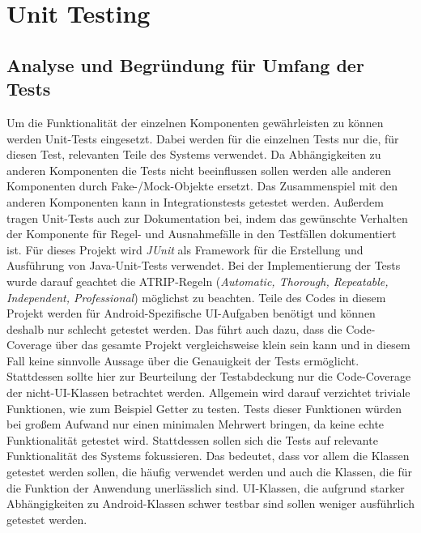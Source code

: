 \chapter{Unit Testing}

\section{Analyse und Begründung für Umfang der Tests}

Um die Funktionalität der einzelnen Komponenten gewährleisten zu können werden Unit-Tests eingesetzt.
Dabei werden für die einzelnen Tests nur die, für diesen Test, relevanten Teile des Systems verwendet.
Da Abhängigkeiten zu anderen Komponenten die Tests nicht beeinflussen sollen werden alle anderen Komponenten durch Fake-/Mock-Objekte ersetzt.
Das Zusammenspiel mit den anderen Komponenten kann in Integrationstests getestet werden.
Außerdem tragen Unit-Tests auch zur Dokumentation bei, indem das gewünschte Verhalten der Komponente für Regel- und Ausnahmefälle in den Testfällen dokumentiert ist.
\newline
Für dieses Projekt wird \textit{JUnit} als Framework für die Erstellung und Ausführung von Java-Unit-Tests verwendet.
Bei der Implementierung der Tests wurde darauf geachtet die ATRIP-Regeln (\textit{Automatic, Thorough, Repeatable, Independent, Professional}) möglichst zu beachten.
\newline
Teile des Codes in diesem Projekt werden für Android-Spezifische UI-Aufgaben benötigt und können deshalb nur schlecht getestet werden. Das führt auch dazu, dass die Code-Coverage über das gesamte Projekt vergleichsweise klein sein kann und in diesem Fall keine sinnvolle Aussage über die Genauigkeit der Tests ermöglicht.
Stattdessen sollte hier zur Beurteilung der Testabdeckung nur die Code-Coverage der nicht-UI-Klassen betrachtet werden.
\newline
Allgemein wird darauf verzichtet triviale Funktionen, wie zum Beispiel Getter zu testen.
Tests dieser Funktionen würden bei großem Aufwand nur einen minimalen Mehrwert bringen, da keine echte Funktionalität getestet wird.
Stattdessen sollen sich die Tests auf relevante Funktionalität des Systems fokussieren.
Das bedeutet, dass vor allem die Klassen getestet werden sollen, die häufig verwendet werden und auch die Klassen, die für die Funktion der Anwendung unerlässlich sind.
UI-Klassen, die aufgrund starker Abhängigkeiten zu Android-Klassen schwer testbar sind sollen weniger ausführlich getestet werden.
\newline

